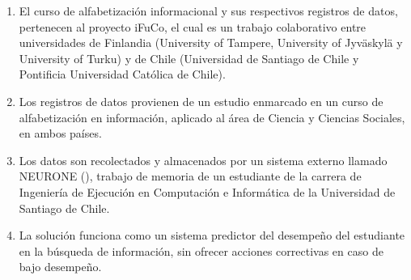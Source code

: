 \begin{enumerate}
	\item El curso de alfabetización informacional y sus respectivos registros de datos, pertenecen al proyecto iFuCo, el cual es un trabajo colaborativo entre universidades de Finlandia (University of Tampere, University of Jyväskylä y University of Turku) y de Chile (Universidad de Santiago de Chile y Pontificia Universidad Católica de Chile). 
	\item Los registros de datos provienen de un estudio enmarcado en un curso de alfabetización en información, aplicado al área de Ciencia y Ciencias Sociales, en ambos países.
	\item Los datos son recolectados y almacenados por un sistema externo llamado NEURONE (), trabajo de memoria de un estudiante de la carrera de Ingeniería de Ejecución en Computación e Informática de la Universidad de Santiago de Chile.
	\item La solución funciona como un sistema predictor del desempeño del estudiante en la búsqueda de información, sin ofrecer acciones correctivas en caso de bajo desempeño.
\end{enumerate}